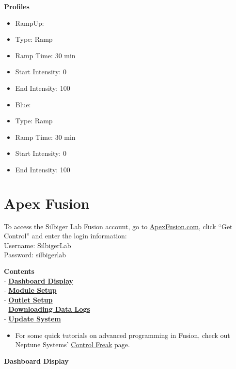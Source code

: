 \documentclass[]{book}
\providecommand{\tightlist}{%
  \setlength{\itemsep}{0pt}\setlength{\parskip}{0pt}}
\begin{document}
 \textbf{Profiles}

\begin{itemize}
\tightlist
\item
  RampUp:
\item
  Type: Ramp
\item
  Ramp Time: 30 min
\item
  Start Intensity: 0
\item
  End Intensity: 100
\item
  Blue:
\item
  Type: Ramp
\item
  Ramp Time: 30 min
\item
  Start Intensity: 0
\item
  End Intensity: 100
\end{itemize}

\chapter{Apex Fusion}\label{apex-fusion}

To access the Silbiger Lab Fusion account, go to
\href{https://apexfusion.com}{ApexFusion.com}, click ``Get Control'' and
enter the login information:\\
Username: SilbigerLab\\
Password: silbigerlab

\textbf{Contents}\\
- \protect\hyperlink{Dashboard}{\textbf{Dashboard Display}}\\
- \protect\hyperlink{Module_Setup}{\textbf{Module Setup}}\\
- \protect\hyperlink{Outlet_Setup}{\textbf{Outlet Setup}}\\
- \protect\hyperlink{Data_Logs}{\textbf{Downloading Data Logs}}\\
- \protect\hyperlink{Update}{\textbf{Update System}}

\begin{itemize}
\tightlist
\item
  For some quick tutorials on advanced programming in Fusion, check out
  Neptune Systems'
  \href{https://www.neptunesystems.com/getstarted/apexng/apex-control-freak-advanced/}{Control
  Freak} page.
\end{itemize}

 \textbf{Dashboard Display}
\end{document}
